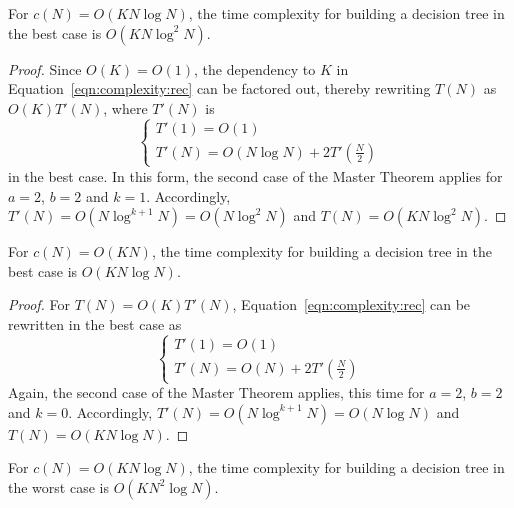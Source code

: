 \begin{theorem}\label{thm:6:best:knlogn}
For $c(N)=O(K N\log N)$, the time complexity for building a decision
tree in the best case is $O(K N \log^2 N)$.
\end{theorem}

\begin{proof}
Since $O(K)=O(1)$, the dependency to $K$ in Equation~\ref{eqn:complexity:rec} can be factored out,
thereby rewriting $T(N)$ as $O(K) T'(N)$, where $T'(N)$ is
\begin{equation}
\begin{cases}
T'(1) = O(1) \\
T'(N) = O(N\log N) + 2 T'(\frac{N}{2})
\end{cases}
\end{equation}
in the best case. In this form, the second case of the Master Theorem applies for
$a=2$, $b=2$ and $k=1$. Accordingly, $T'(N)=O(N\log^{k+1} N)=O(N\log^2 N)$ and $T(N) = O(K N\log^2 N)$.
\end{proof}

\begin{theorem}\label{thm:6:best:kn}
For $c(N)=O(K N)$, the time complexity for building a decision
tree in the best case is $O(K N \log N)$.
\end{theorem}

\begin{proof}
For $T(N) = O(K)T'(N)$, Equation~\ref{eqn:complexity:rec}
can be rewritten in the best case as
\begin{equation}
\begin{cases}
T'(1) = O(1) \\
T'(N) = O(N) + 2 T'(\frac{N}{2})
\end{cases}
\end{equation}
Again, the second case of the Master Theorem applies, this time for $a=2$, $b=2$ and $k=0$.
Accordingly, $T'(N)=O(N\log^{k+1} N)=O(N\log N)$ and $T(N) = O(K N\log N)$.
\end{proof}

\begin{theorem}\label{thm:6:worst:knlogn}
For $c(N)=O(K N\log N)$, the time complexity for building a decision
tree in the worst case is $O(K N^2 \log N)$.
\end{theorem}

